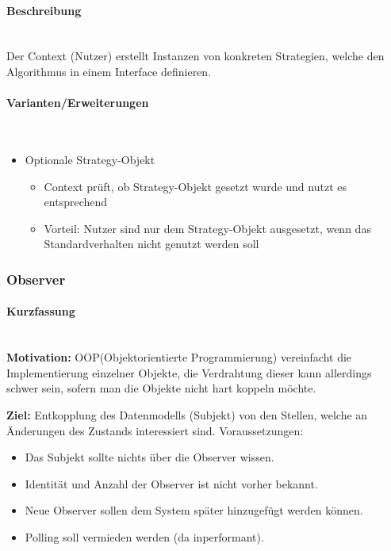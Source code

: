 \documentclass[ngerman,color=3b]{tuda_summary}
\begin{document}
\paragraph{Beschreibung}\mbox{}\\
Der Context (Nutzer) erstellt Instanzen von konkreten Strategien, welche den Algorithmus in einem Interface definieren.

\paragraph{Varianten/Erweiterungen}\mbox{}\\
\begin{itemize}
    \item Optionale Strategy-Objekt
          \begin{itemize}
              \item Context prüft, ob Strategy-Objekt gesetzt wurde und nutzt es entsprechend
              \item Vorteil: Nutzer sind nur dem Strategy-Objekt ausgesetzt, wenn das Standardverhalten nicht genutzt werden soll
          \end{itemize}
\end{itemize}

\subsubsection{Observer}
\paragraph{Kurzfassung}\mbox{}\\
\textbf{Motivation:} OOP(Objektorientierte Programmierung) vereinfacht die Implementierung einzelner Objekte, die Verdrahtung dieser kann allerdings schwer sein, sofern man die Objekte nicht hart koppeln möchte.

\textbf{Ziel:} Entkopplung des Datenmodells (Subjekt) von den Stellen, welche an Änderungen des Zustands interessiert sind. Voraussetzungen:
\begin{itemize}
    \item Das Subjekt sollte nichts über die Observer wissen.
    \item Identität und Anzahl der Observer ist nicht vorher bekannt.
    \item Neue Observer sollen dem System später hinzugefügt werden können.
    \item Polling soll vermieden werden (da inperformant).
\end{itemize}
\end{document}
